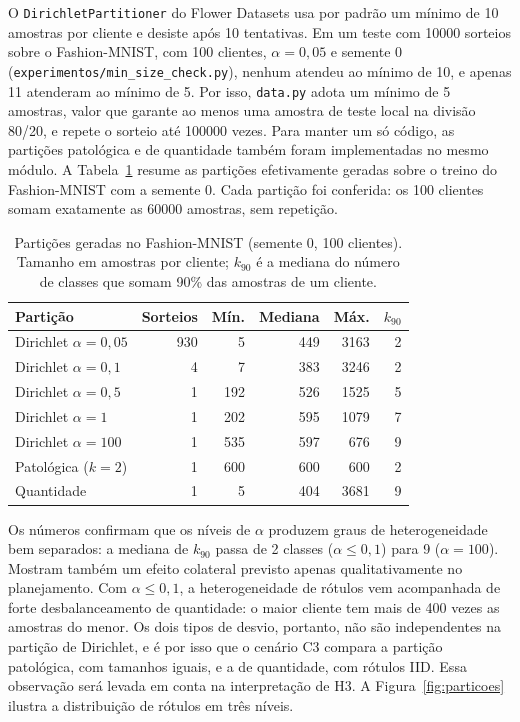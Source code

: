O \texttt{DirichletPartitioner} do Flower Datasets \citep{beutel2020flower} usa por padrão um mínimo de 10 amostras por cliente e desiste após 10 tentativas. Em um teste com \num{10000} sorteios sobre o Fashion-MNIST, com 100 clientes, $\alpha = 0{,}05$ e semente 0 (\texttt{experimentos/min\_size\_check.py}), nenhum atendeu ao mínimo de 10, e apenas 11 atenderam ao mínimo de 5. Por isso, \texttt{data.py} adota um mínimo de 5 amostras, valor que garante ao menos uma amostra de teste local na divisão 80/20, e repete o sorteio até \num{100000} vezes. Para manter um só código, as partições patológica e de quantidade também foram implementadas no mesmo módulo. A Tabela~\ref{tab:particoes} resume as partições efetivamente geradas sobre o treino do Fashion-MNIST com a semente 0. Cada partição foi conferida: os 100 clientes somam exatamente as \num{60000} amostras, sem repetição.

\begin{table}[ht]
    \centering\small
    \caption{Partições geradas no Fashion-MNIST (semente 0, 100 clientes). Tamanho em amostras por cliente; $k_{90}$ é a mediana do número de classes que somam 90\% das amostras de um cliente.}
    \label{tab:particoes}
    \setlength{\tabcolsep}{4pt}
    \begin{tabular}{@{}lrrrrr@{}}
        \toprule
        Partição & Sorteios & Mín. & Mediana & Máx. & $k_{90}$ \\
        \midrule
        Dirichlet $\alpha = 0{,}05$ & 930 & 5 & 449 & \num{3163} & 2 \\
        Dirichlet $\alpha = 0{,}1$ & 4 & 7 & 383 & \num{3246} & 2 \\
        Dirichlet $\alpha = 0{,}5$ & 1 & 192 & 526 & \num{1525} & 5 \\
        Dirichlet $\alpha = 1$ & 1 & 202 & 595 & \num{1079} & 7 \\
        Dirichlet $\alpha = 100$ & 1 & 535 & 597 & 676 & 9 \\
        Patológica ($k = 2$) & 1 & 600 & 600 & 600 & 2 \\
        Quantidade & 1 & 5 & 404 & \num{3681} & 9 \\
        \bottomrule
    \end{tabular}
\end{table}

Os números confirmam que os níveis de $\alpha$ produzem graus de heterogeneidade bem separados: a mediana de $k_{90}$ passa de 2 classes ($\alpha \leq 0{,}1$) para 9 ($\alpha = 100$). Mostram também um efeito colateral previsto apenas qualitativamente no planejamento. Com $\alpha \leq 0{,}1$, a heterogeneidade de rótulos vem acompanhada de forte desbalanceamento de quantidade: o maior cliente tem mais de 400 vezes as amostras do menor. Os dois tipos de desvio, portanto, não são independentes na partição de Dirichlet, e é por isso que o cenário C3 compara a partição patológica, com tamanhos iguais, e a de quantidade, com rótulos IID. Essa observação será levada em conta na interpretação de H3. A Figura~\ref{fig:particoes} ilustra a distribuição de rótulos em três níveis.

